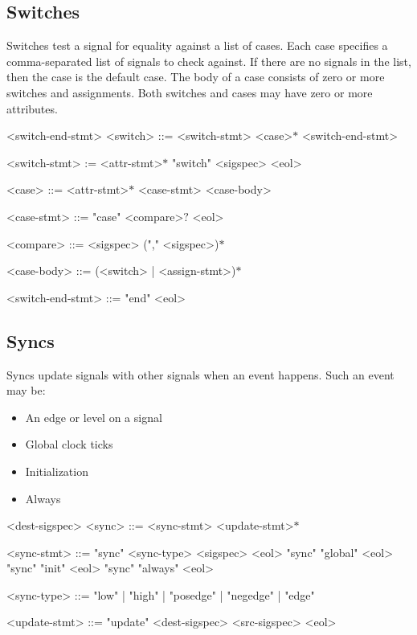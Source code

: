 \subsection{Switches}

Switches test a signal for equality against a list of cases. Each case specifies a comma-separated list of signals to check against. If there are no signals in the list, then the case is the default case. The body of a case consists of zero or more switches and assignments. Both switches and cases may have zero or more attributes.

\begin{indentgrammar}{<switch-end-stmt>}
<switch> ::= <switch-stmt> <case>$*$ <switch-end-stmt>

<switch-stmt> := <attr-stmt>$*$ "switch" <sigspec> <eol>

<case> ::= <attr-stmt>$*$ <case-stmt> <case-body>

<case-stmt> ::= "case" <compare>$?$ <eol>

<compare> ::= <sigspec> ("," <sigspec>)$*$

<case-body> ::= (<switch> | <assign-stmt>)$*$

<switch-end-stmt> ::= "end" <eol>
\end{indentgrammar}

\subsection{Syncs}

Syncs update signals with other signals when an event happens. Such an event may be:

\begin{itemize}
  \item An edge or level on a signal
  \item Global clock ticks
  \item Initialization
  \item Always
\end{itemize}

\begin{indentgrammar}{<dest-sigspec>}
<sync> ::= <sync-stmt> <update-stmt>$*$

<sync-stmt> ::= 
"sync" <sync-type> <sigspec> <eol>
  \alt "sync" "global" <eol>
  \alt "sync" "init" <eol>
  \alt "sync" "always" <eol>

<sync-type> ::= "low" | "high" | "posedge" | "negedge" | "edge"

<update-stmt> ::= "update" <dest-sigspec> <src-sigspec> <eol>
\end{indentgrammar}
